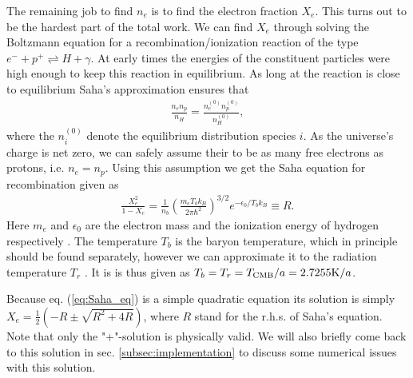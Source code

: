 \documentclass[twocolumn]{aastex62}
\begin{document}
The remaining job to find $n_e$ is to find the electron fraction $X_e$. This turns out to be the hardest part of the total work. We can find $X_e$ through solving the Boltzmann equation for a recombination/ionization reaction of the type $e^{-} + p^{+} \rightleftharpoons H + \gamma$. At early times the energies of the constituent particles were high enough to keep this reaction in equilibrium. As long at the reaction is close to equilibrium Saha's approximation \citep[p. 70]{dodelson:2003} ensures that 
\begin{align}
    \frac{n_e n_p}{n_H} = \frac{n_e^{(0)}n_p^{(0)}}{n_H^{(0)}},
\end{align}
where the $n_i^{(0)}$ denote the equilibrium distribution species $i$. As the universe's charge is net zero, we can safely assume their to be as many free electrons as protons, i.e. $n_e = n_p$. Using this assumption we get the Saha equation for recombination given as 
\begin{align}
    \frac{X_e^2}{1 - X_e} = \frac{1}{n_b} \left(\frac{m_e
    T_bk_B}{2\pi\hbar^2}\right)^{3/2} e^{-\epsilon_0/T_bk_B} \equiv R.
    \label{eq:Saha_eq}
\end{align}
Here $m_e$ and $\epsilon_0$ are the electron mass and the ionization energy of hydrogen respectively \citep[]{winther:2020}. The temperature $T_b$ is the baryon temperature, which in principle should be found separately, however we can approximate it to the radiation temperature $T_r$ \citep[]{winther:2020}. It is is thus given as $T_b =
T_r = T_{\rm CMB} / a = 2.7255 \textrm{K} / a$.

Because eq. (\ref{eq:Saha_eq}) is a simple quadratic equation its solution is simply 
$X_e = \frac{1}{2} (-R \pm \sqrt{R^2 + 4R})$, where $R$ stand for the r.h.s. of Saha's equation. Note that only the "+"-solution is physically valid. We will also briefly come back to this solution in sec. \ref{subsec:implementation} to discuss some numerical issues with this solution.
\end{document}
